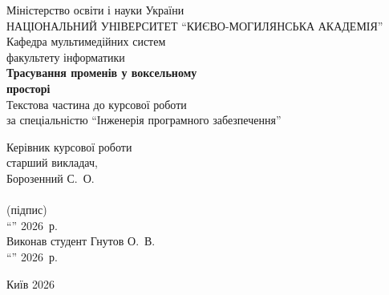 \begin{titlepage}
    \begin{center}
        {\large Міністерство освіти і науки України}\\[1em]
        {\large НАЦІОНАЛЬНИЙ УНІВЕРСИТЕТ ``КИЄВО-МОГИЛЯНСЬКА АКАДЕМІЯ''}\\[0em]
        {\large Кафедра мультимедійних систем\\факультету інформатики}\\[4em]
        
        {\Large \textbf{Трасування променів у воксельному\\просторі}}\\[4em]
        
        {\large Текстова частина до курсової роботи\\[0.5em]
        за спеціальністю ``Інженерія програмного забезпечення''}\\[4em]
        
        \begin{flushright}
        Керівник курсової роботи\\
        старший викладач,\\
        Борозенний С.~О.\\[2em]
        
        \underline{\hspace{4cm}}\\
        (підпис)\\[1em]
        
        ``\underline{\hspace{1cm}}'' \underline{\hspace{3cm}} 2026~р.\\[3em]
        
        Виконав студент Гнутов О.~В.\\[1em]
        ``\underline{\hspace{1cm}}'' \underline{\hspace{3cm}} 2026~р.\\
        \end{flushright}
        
        \vfill
        Київ 2026
    \end{center}
    \newpage
\end{titlepage}